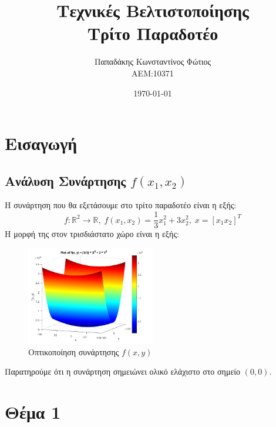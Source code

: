 \documentclass{report}
\begin{document}

\title{\Huge \bfseries Τεχνικές Βελτιστοποίησης \\ Τρίτο Παραδοτέο} %
\author{Παπαδάκης Κωνσταντίνος Φώτιος\vspace{0.5cm} \\  ΑΕΜ:10371} %
\date{\today}
\maketitle

\tableofcontents

\chapter{Εισαγωγή}
\section{Ανάλυση Συνάρτησης $f(x_1,x_2)$}
Η συνάρτηση που θα εξετάσουμε στο τρίτο παραδοτέο είναι η εξής:
$$ f: \mathbb{R}^2 \to \mathbb{R},\; f(x_1,x_2) = \frac{1}{3} x_1^2 + 3x_2^2,\; x = [x_1 x_2]^T$$
Η μορφή της στον τρισδιάστατο χώρο είναι η εξής:
\begin{figure}[H]
    \centering
    \includegraphics[width=0.5\textwidth]{media/visual.png}
    \caption{Οπτικοποίηση συνάρτησης $f(x,y)$}
\end{figure} 
Παρατηρούμε ότι η συνάρτηση σημειώνει ολικό ελάχιστο στο σημείο $(0,0)$.

\chapter{Θέμα 1}
\end{document}
